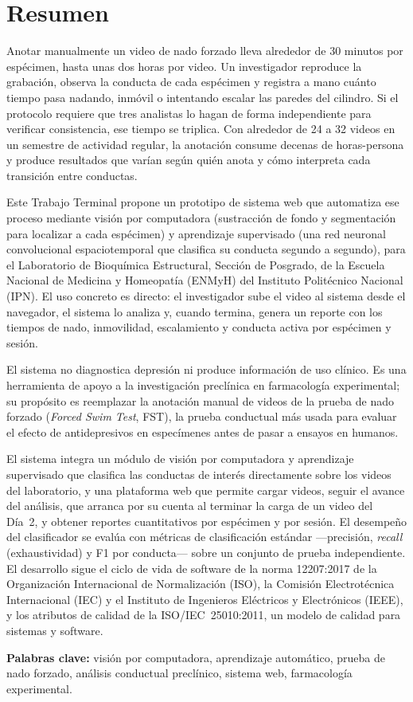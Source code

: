 \chapter*{Resumen}

Anotar manualmente un video de nado forzado lleva alrededor de 30 minutos por espécimen, hasta unas dos horas por video. Un investigador reproduce la grabación, observa la conducta de cada espécimen y
registra a mano cuánto tiempo pasa nadando, inmóvil o intentando escalar las paredes
del cilindro. Si el protocolo requiere que tres analistas lo hagan de forma
independiente para verificar consistencia, ese tiempo se triplica. Con alrededor de 24 a
32 videos en un semestre de actividad regular, la anotación consume decenas de
horas-persona y produce resultados que varían según quién anota y cómo interpreta cada transición entre conductas.

Este Trabajo Terminal propone un prototipo de sistema web que automatiza ese proceso
mediante visión por computadora (sustracción de fondo y segmentación para localizar a
cada espécimen) y aprendizaje supervisado (una red neuronal convolucional espaciotemporal
que clasifica su conducta segundo a segundo), para el Laboratorio de Bioquímica
Estructural, Sección de Posgrado, de la Escuela Nacional de Medicina y Homeopatía
(ENMyH) del Instituto Politécnico Nacional (IPN). El uso concreto
es directo: el investigador sube el video al sistema desde el navegador, el sistema lo
analiza y, cuando termina, genera un reporte con los tiempos de nado, inmovilidad,
escalamiento y conducta activa por espécimen y sesión.

El sistema no diagnostica depresión ni produce información de uso clínico. Es una
herramienta de apoyo a la investigación preclínica en farmacología experimental; su
propósito es reemplazar la anotación manual de videos de la prueba de nado forzado (\textit{Forced Swim Test}, FST), la
prueba conductual más usada para evaluar el efecto de antidepresivos en especímenes antes de
pasar a ensayos en humanos.

El sistema integra un módulo de visión por computadora y aprendizaje supervisado que
clasifica las conductas de interés directamente sobre los videos del laboratorio, y una
plataforma web que permite cargar videos, seguir el avance del análisis, que arranca por su
cuenta al terminar la carga de un video del Día~2, y obtener reportes cuantitativos por espécimen y por sesión. El desempeño del clasificador se evalúa con
métricas de clasificación estándar ---precisión, \textit{recall} (exhaustividad) y F1 por conducta--- sobre
un conjunto de prueba independiente. El desarrollo sigue el ciclo de vida de software
de la norma 12207:2017 de la Organización Internacional de Normalización (ISO), la Comisión
Electrotécnica Internacional (IEC) y el Instituto de Ingenieros Eléctricos y Electrónicos (IEEE), y los
atributos de calidad de la ISO/IEC~25010:2011, un modelo de calidad para sistemas y software.



\noindent\textbf{Palabras clave:} visión por computadora, aprendizaje automático,
prueba de nado forzado, análisis conductual preclínico, sistema web, farmacología
experimental.
